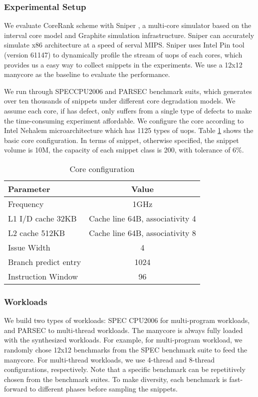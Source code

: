 \subsubsection{Experimental Setup}
We evaluate CoreRank scheme with Sniper \cite{sniper}, a multi-core simulator based on the interval core model\cite{IntervalSimulation} and Graphite\cite{Graphite} simulation infrastructure. Sniper can accurately simulate x86 architecture at a speed of serval MIPS. Sniper uses Intel Pin tool (version 61147) to dynamically profile the stream of uops of each cores, which provides us a easy way to collect snippets in the experiments.   We use a 12x12 manycore as the baseline to evaluate the performance.

We run through SPECCPU2006 and PARSEC benchmark suits, which generates over ten thousands of snippets under different core degradation models. We assume each core, if has defect,  only suffers from a single type of defects to make the time-consuming experiment affordable.   We configure the core  according to Intel Nehalem microarchitecture which has 1125 types of uops.  Table \ref{Exp} shows the basic core configuration.   In terms of snippet, otherwise specified, the snippet volume is 10M, the capacity of each snippet class is 200, with tolerance of 6\%.


\begin{table}
  \setlength{\tabcolsep}{6mm}
\caption{Core configuration}\label{Exp}
\begin{center}\small
    \begin{tabular}{@{}lc}
  \toprule
  \textbf{Parameter} &\textbf{ Value} \\
\midrule
  Frequency & 1GHz \\
  L1 I/D cache 32KB &  Cache line 64B, associativity 4 \\
  L2 cache  512KB &  Cache line 64B, associativity 8 \\
  Issue Width &  4 \\
  Branch predict entry  &  1024\\
  Instruction Window &  96 \\
\bottomrule
  \end{tabular}
  
  \end{center}
\end{table}

\subsubsection{Workloads}
We  build two types of workloads: SPEC CPU2006 for multi-program workloads, and PARSEC to multi-thread workloads.  The manycore is always fully loaded with the synthesized workloads. For example, for multi-program workload, we randomly chose 12x12 benchmarks from the SPEC benchmark suite to feed the manycore.   For multi-thread workloads, we use 4-thread and 8-thread configurations, respectively.   Note that a specific benchmark can be repetitively chosen from the benchmark suites. To make diversity, each benchmark is fast-forward to different phases before sampling the snippets.


